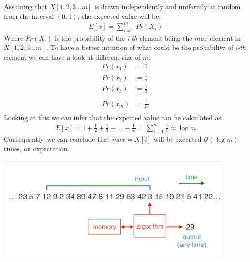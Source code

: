 \documentclass[11pt,a4paper,english]{article}
\begin{document}
\begin{enumerate}
        Assuming that $X[1,2,3...m]$ is drawn independently and uniformly at random from the interval $(0,1)$, the expected value will be:
        \begin{align*}
          E[x] = \sum\limits_{i=1}^{m} Pr(X_i)
        \end{align*}
        Where $Pr(X_i)$ is the probability of the \textit{i-th} element being the $max$ element in $X[1,2,3...m]$. To have a better intuition of what could be the probability of \textit{i-th} element we can have a look at different size of $m$:
        \begin{align*}
          Pr(x_1) & = 1 \\
          Pr(x_2) & = \frac{1}{2} \\
          Pr(x_3) & = \frac{1}{3} \\
                  & ... \\
          Pr(x_m) & = \frac{1}{m} \\
        \end{align*}
        Looking at this we can infer that the expected value can be calculated as:
        \begin{align*}
          E[x] = 1 + \frac{1}{2} + \frac{1}{3} + ... + \frac{1}{m} = \sum\limits_{i=1}^{m}{\frac{1}{i}} \approx \log{m}
        \end{align*}
        Consequently, we can conclude that $max = X[i]$ will be executed $\mathcal{O}(\log m)$ times, on expectation.

        \begin{center}
          \includegraphics[width=12cm]{1_sliding_window.png}
        \end{center}


\end{enumerate}
\end{document}

